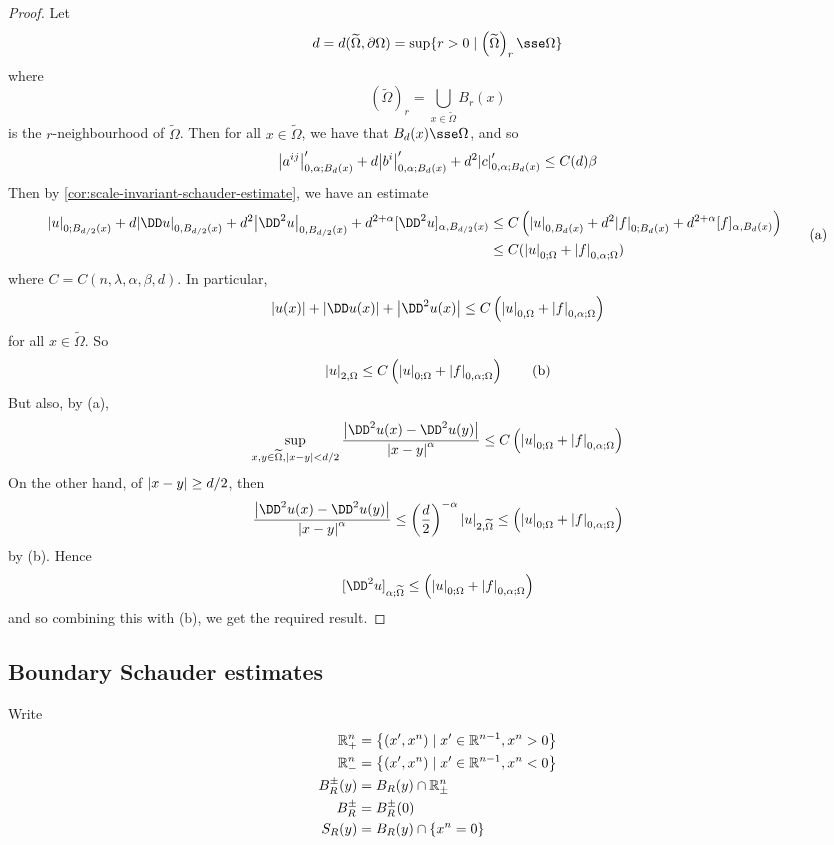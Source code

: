 \documentclass{article}
\begin{document}
\begin{proof}
    Let 
    \[d = d(\widetilde\Omega, \partial\Omega) = \sup\{r > 0 \mid \left(\widetilde\Omega\right)_r \sse \Omega\}\]
    where
    \[(\widetilde\Omega)_r = \bigcup_{x \in \widetilde\Omega}B_r(x)\]
    is the \(r\)-neighbourhood of \(\widetilde\Omega\). Then for all \(x \in \widetilde \Omega\), we have that \(B_d(x) \sse \Omega\), and so
    \[\abs{a^{ij}}'_{0, \alpha; B_d(x)} + d\abs{b^i}'_{0, \alpha; B_d(x)} + d^2\abs{c}'_{0, \alpha; B_d(x)} \le C(d)\beta\]
    Then by \cref{cor:scale-invariant-schauder-estimate}, we have an estimate
    \begin{equation}
        \begin{split}
            \abs{u}_{0; B_{d/2}(x)} + d\abs{\DD u}_{0, B_{d/2}(x)} + d^2 \abs{\DD^2 u}_{0, B_{d/2}(x)} + d^{2 + \alpha}[\DD^2u]_{\alpha, B_{d/2}(x)} &\le C\left(\abs{u}_{0, B_d(x)} + d^2\abs{f}_{0; B_d(x)} + d^{2 + \alpha}[f]_{\alpha, B_d(x)}\right) \\
            &\le C(\abs{u}_{0; \Omega} + \abs{f}_{0, \alpha; \Omega})
        \end{split}
        \tag{a}
    \end{equation}
    where \(C = C(n, \lambda, \alpha, \beta, d)\). In particular,
    \[\abs{u(x)} + \abs{\DD u(x)} + \abs{\DD^2 u(x)} \le C\left(\abs{u}_{0, \Omega} + \abs{f}_{0, \alpha; \Omega}\right)\]
    for all \(x \in \widetilde\Omega\). So
    \[\abs{u}_{2, \Omega} \le C\left(\abs{u}_{0; \Omega} + \abs{f}_{0, \alpha; \Omega}\right) \tag{b}\]
    But also, by (a),
    \[\sup_{x, y \in \widetilde\Omega, \abs{x - y} < d/2}\frac{\abs{\DD^2 u(x) - \DD^2 u(y)}}{\abs{x - y}^\alpha} \le C\left(\abs{u}_{0; \Omega} + \abs{f}_{0, \alpha; \Omega}\right)\]
    On the other hand, of \(\abs{x - y} \ge d/2\), then
    \[\frac{\abs{\DD^2u(x) - \DD^2 u(y)}}{\abs{x - y}^\alpha} \le \left(\frac{d}{2}\right)^{-\alpha}\abs{u}_{2, \widetilde\Omega} \le \left(\abs{u}_{0; \Omega} + \abs{f}_{0, \alpha; \Omega}\right)\]
    by (b). Hence
    \[[\DD^2 u]_{\alpha; \widetilde\Omega} \le \left(\abs{u}_{0; \Omega} + \abs{f}_{0, \alpha; \Omega}\right)\]
    and so combining this with (b), we get the required result.
\end{proof}

\subsection{Boundary Schauder estimates}

Write
\begin{align*}
    \mathbb{R}^n_+ &= \left\{(x', x^n) \mid x' \in \mathbb{R}^{n-1}, x^n > 0\right\} \\
    \mathbb{R}^n_- &= \left\{(x', x^n) \mid x' \in \mathbb{R}^{n-1}, x^n < 0\right\} \\
    B_R^\pm(y) &= B_R(y) \cap \mathbb{R}^n_\pm \\
    B_R^\pm &= B_R^\pm(0) \\
    S_R(y) &= B_R(y) \cap \{x^n = 0\} \\
\end{align*}
\end{document}
